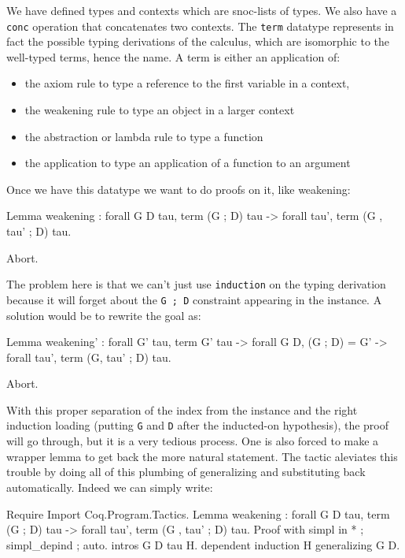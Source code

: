 \begin{coq_example*}
We have defined types and contexts which are snoc-lists of types. We
also have a {\tt conc} operation that concatenates two contexts.
The {\tt term} datatype represents in fact the possible typing
derivations of the calculus, which are isomorphic to the well-typed
terms, hence the name. A term is either an application of:
\begin{itemize}
\item the axiom rule to type a reference to the first variable in a context,
\item the weakening rule to type an object in a larger context
\item the abstraction or lambda rule to type a function
\item the application to type an application of a function to an argument
\end{itemize}

Once we have this datatype we want to do proofs on it, like weakening:

\begin{coq_example*}
Lemma weakening : forall G D tau, term (G ; D) tau -> 
  forall tau', term (G , tau' ; D) tau.
\end{coq_example*}
\begin{coq_eval}
  Abort.
\end{coq_eval}

The problem here is that we can't just use {\tt induction} on the typing
derivation because it will forget about the {\tt G ; D} constraint
appearing in the instance. A solution would be to rewrite the goal as:
\begin{coq_example*}
Lemma weakening' : forall G' tau, term G' tau -> 
  forall G D, (G ; D) = G' ->
  forall tau', term (G, tau' ; D) tau.
\end{coq_example*}
\begin{coq_eval}
  Abort.
\end{coq_eval}

With this proper separation of the index from the instance and the right
induction loading (putting {\tt G} and {\tt D} after the inducted-on
hypothesis), the proof will go through, but it is a very tedious
process. One is also forced to make a wrapper lemma to get back the
more natural statement. The \depind tactic aleviates this trouble by
doing all of this plumbing of generalizing and substituting back automatically.
Indeed we can simply write:

\begin{coq_example*}
Require Import Coq.Program.Tactics.
Lemma weakening : forall G D tau, term (G ; D) tau -> 
  forall tau', term (G , tau' ; D) tau.
Proof with simpl in * ; simpl_depind ; auto.
  intros G D tau H.
  dependent induction H generalizing G D.
\end{coq_example*}


\end{coq_example*}
